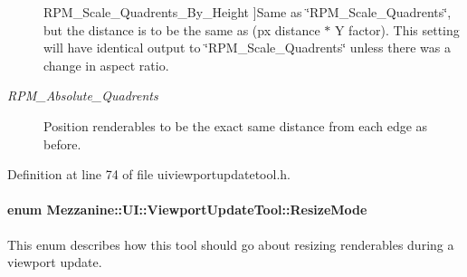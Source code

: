 \begin{Desc}
\begin{description}
{{RPM\_\-Scale\_\-Quadrents\_\-By\_\-Height}
\label{classMezzanine_1_1UI_1_1ViewportUpdateTool_ad2de82a6fc57859d914845ce676ff67ea5689ccb5755157c9a3fb8088ba89bbf2}
}]Same as \char`\"{}RPM\_\-Scale\_\-Quadrents\char`\"{}, but the distance is to be the same as (px distance $\ast$ Y factor). This setting will have identical output to \char`\"{}RPM\_\-Scale\_\-Quadrents\char`\"{} unless there was a change in aspect ratio. \item[{\em 
\hypertarget{classMezzanine_1_1UI_1_1ViewportUpdateTool_ad2de82a6fc57859d914845ce676ff67eaad6d1e0cde23b744226a1ae7548eedee}{
RPM\_\-Absolute\_\-Quadrents}
\label{classMezzanine_1_1UI_1_1ViewportUpdateTool_ad2de82a6fc57859d914845ce676ff67eaad6d1e0cde23b744226a1ae7548eedee}
}]Position renderables to be the exact same distance from each edge as before. \end{description}
\end{Desc}



Definition at line 74 of file uiviewportupdatetool.h.

\hypertarget{classMezzanine_1_1UI_1_1ViewportUpdateTool_a89afdf79f52d5bf18bdffd323911a549}{
\paragraph[{ResizeMode}]{\setlength{\rightskip}{0pt plus 5cm}enum {\bf Mezzanine::UI::ViewportUpdateTool::ResizeMode}}\hfill}
\label{classMezzanine_1_1UI_1_1ViewportUpdateTool_a89afdf79f52d5bf18bdffd323911a549}


This enum describes how this tool should go about resizing renderables during a viewport update. 

